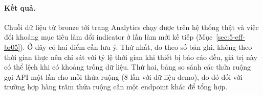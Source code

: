 \paragraph{Kết quả.} Chuỗi dữ liệu từ bronze tới trang Analytics chạy được trên hệ thống thật và việc đổi khoảng mục tiêu làm đổi indicator ở lần làm mới kế tiếp (Mục~\ref{sec:5-eff-br05}). Ở đây có hai điểm cần lưu ý. Thứ nhất,  đo theo số bản ghi, không theo thời gian thực nên chỉ sát với tỷ lệ thời gian khi thiết bị báo cáo đều, giá trị này có thể lệch khi có khoảng trống dữ liệu. Thứ hai, bảng so sánh các thửa ruộng gọi API một lần cho mỗi thửa ruộng (8 lần với dữ liệu demo), do đó đối với trường hợp hàng trăm thửa ruộng cần một endpoint khác để tổng hợp.
